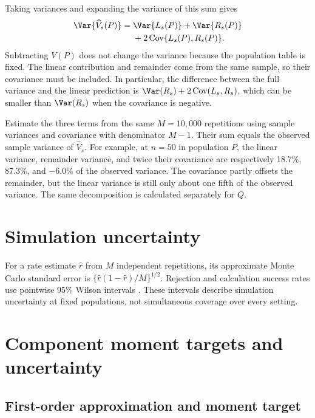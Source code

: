 Taking variances and expanding the variance of this sum gives
\begin{equation}
\begin{aligned}
 \Var\{\widehat V_s(P)\}
 ={}&\Var\{L_s(P)\}+\Var\{R_s(P)\}\\
    &+2\operatorname{Cov}\{L_s(P),R_s(P)\}.
\end{aligned}
 \label{eq:linear-remainder-variance-decomposition}
\end{equation}
Subtracting \(V(P)\) does not change the variance because the population
table is fixed. The linear contribution and remainder come from the same
sample, so their covariance must be included. In particular, the
difference between the full variance and the linear prediction is
\(\Var(R_s)+2\operatorname{Cov}(L_s,R_s)\), which can be smaller than
\(\Var(R_s)\) when the covariance is negative.

Estimate the three terms from the same \(M=10{,}000\) repetitions using sample
variances and covariance with denominator \(M-1\). Their sum equals the
observed sample variance of \(\widehat V_s\). For example, at \(n=50\)
in population \(P\), the linear variance, remainder variance, and twice
their covariance are respectively 18.7\%, 87.3\%, and \(-6.0\%\) of
the observed variance. The covariance partly offsets the remainder, but
the linear variance is still only about one fifth of the observed
variance. The same decomposition is calculated separately for \(Q\).

\section{Simulation uncertainty}
\label{sec:simulation-uncertainty}

For a rate estimate \(\widehat r\) from \(M\) independent repetitions,
its approximate Monte Carlo standard error is
\(\{\widehat r(1-\widehat r)/M\}^{1/2}\).
Rejection and calculation success rates use pointwise 95\% Wilson intervals
\citep{wilson1927}. These intervals describe simulation uncertainty at fixed
populations, not simultaneous coverage over every setting.

\section{Component moment targets and uncertainty}
\label{sec:moment-target-details}
\label{sec:moment-uncertainty}

\subsection{First-order approximation and moment target}

